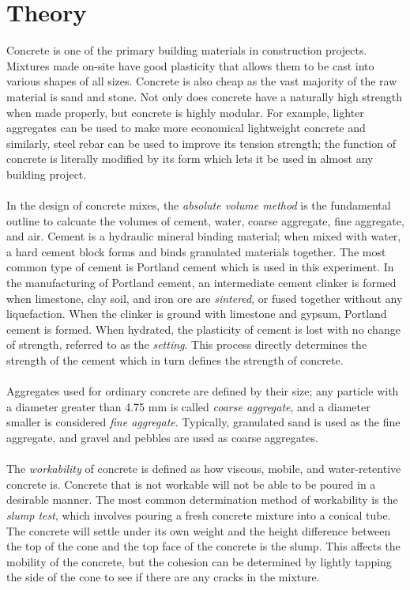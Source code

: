 \documentclass{article}
\begin{document}
    \section{Theory}
    \noindent Concrete is one of the primary building materials in construction projects. Mixtures made on-site have good plasticity that allows them to be cast into various shapes of all sizes. Concrete is also cheap as the vast majority of the raw material is sand and stone. Not only does concrete have a naturally high strength when made properly, but concrete is highly modular. For example, lighter aggregates can be used to make more economical lightweight concrete and similarly, steel rebar can be used to improve its tension strength; the function of concrete is literally modified by its form which lets it be used in almost any building project. \\\\
    In the design of concrete mixes, the \emph{absolute volume method} is the fundamental outline to calcuate the volumes of cement, water, coarse aggregate, fine aggregate, and air. Cement is a hydraulic mineral binding material; when mixed with water, a hard cement block forms and binds granulated materials together. The most common type of cement is Portland cement which is used in this experiment. In the manufacturing of Portland cement, an intermediate cement clinker is formed when limestone, clay soil, and iron ore are \emph{sintered}, or fused together without any liquefaction. When the clinker is ground with limestone and gypsum, Portland cement is formed. When hydrated, the plasticity of cement is lost with no change of strength, referred to as the \emph{setting}. This process directly determines the strength of the cement which in turn defines the strength of concrete.\\\\
    Aggregates used for ordinary concrete are defined by their size; any particle with a diameter greater than 4.75 mm is called \emph{coarse aggregate}, and a diameter smaller is considered \emph{fine aggregate}. Typically, granulated sand is used as the fine aggregate, and gravel and pebbles are used as coarse aggregates. \\\\
    The \emph{workability} of concrete is defined as how viscous, mobile, and water-retentive concrete is. Concrete that is not workable will not be able to be poured in a desirable manner. The most common determination method of workability is the \emph{slump test}, which involves pouring a fresh concrete mixture into a conical tube. The concrete will settle under its own weight and the height difference between the top of the cone and the top face of the concrete is the slump. This affects the mobility of the concrete, but the cohesion can be determined by lightly tapping the side of the cone to see if there are any cracks in the mixture. \\\\
\end{document}
